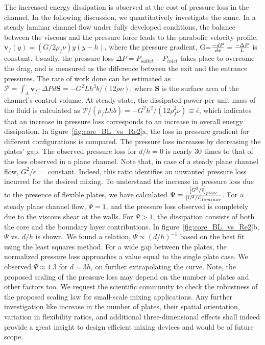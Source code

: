 \documentclass[aps,pre,twocolumn,aps,longbibliography]{revtex4-1}
\begin{document}
	
	The increased energy dissipation is observed at the cost of pressure loss in the channel. In the following discussion, we quantitatively investigate the same. In a steady laminar channel flow under fully developed conditions, the balance between the viscous and the pressure force leads to the parabolic velocity profile, $\mathbf{v}_f(y)=(G/2\rho_f\nu)y(y-h)$, where the pressure gradient, G=${-dP\over dx}={-\Delta P\over L}$ is constant. Usually, the pressure loss $\Delta P=P_{outlet}-P_{inlet}$ takes place to overcome the drag, and is measured as the difference between the exit and the entrance pressures. The rate of work done can be estimated as $\mathscr{P}=\int_{A}\mathbf{v}_f\cdot \Delta P d\mathbf{S}=-{G^2Lh^3b/(12\rho\nu)}$, where $\mathbf{S}$ is the surface area of the channel's control volume. At steady-state, the dissipated power per unit mass of the fluid is calculated as $\mathscr{P}/(\rho_f Lhb) =-G^2h^2/(12\rho_f^2\nu) \equiv\overline{\epsilon}$, which indicates that an increase in pressure loss corresponds to an increase in overall energy dissipation. In figure~\ref{fig:core_BL_vs_Re2}a, the loss in pressure gradient for different configurations is compared. The pressure loss increases by decreasing the plates' gap. The observed pressure loss for $d/h=0$ is nearly 30 times to that of the loss observed in a plane channel. Note that, in case of a steady plane channel flow, $G^2/\overline{\epsilon}=$ constant. Indeed, this ratio identifies an unwanted pressure loss incurred for the desired mixing. To understand the increase in pressure loss due to the presence of flexible plates, we have calculated $\Psi={\left[{G^2/ \overline{\epsilon}}\right]_{plate} \over \left[{G^2/\overline{\epsilon}}\right]_{laminar}}$. For a steady plane channel flow, $\Psi=1$, and the pressure loss observed is completely due to the viscous shear at the walls. For $\Psi> 1$, the dissipation consists of both the core and the boundary layer contributions. In figure~\ref{fig:core_BL_vs_Re2}b, $\Psi$ vs. $d/h$ is shown. We found a relation, $\Psi\propto (d/h)^{-1}$ based on the best fit using the least squares method. For a wide gap between the plates, the normalized pressure loss approaches a value equal to the single plate case. We observed $\Psi\approx1.3$ for $d=3h$, on further extrapolating the curve. Note, the proposed scaling of the pressure loss may depend on the number of plates and other factors too. We request the scientific community to check the robustness of the proposed scaling law for small-scale mixing applications. Any further investigation like increase in the number of plates, their spatial orientation, variation in flexibility ratios, and additional three-dimensional effects shall indeed provide a great insight to design efficient mixing devices and would be of future scope. 
	
\end{document}
